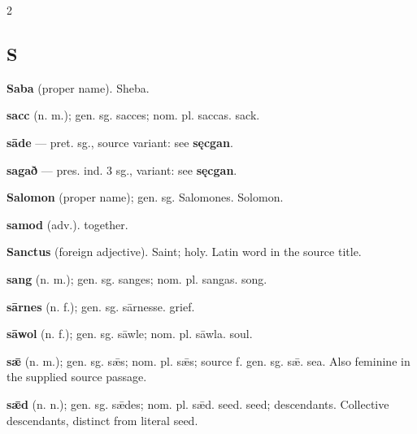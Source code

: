 \begin{multicols*}{2}
\subsection*{S}
\textbf{Saba} (proper name). Sheba.\par
\textbf{sacc} (n. m.); gen. sg. sacces; nom. pl. saccas. sack.\par
\textbf{sāde} — pret. sg., source variant: see \textbf{sęcgan}.\par
\textbf{sagað} — pres. ind. 3 sg., variant: see \textbf{sęcgan}.\par
\textbf{Salomon} (proper name); gen. sg. Salomones. Solomon.\par
\textbf{samod} (adv.). together.\par
\textbf{Sanctus} (foreign adjective). Saint; holy. Latin word in the source title.\par
\textbf{sang} (n. m.); gen. sg. sanges; nom. pl. sangas. song.\par
\textbf{sārnes} (n. f.); gen. sg. sārnesse. grief.\par
\textbf{sāwol} (n. f.); gen. sg. sāwle; nom. pl. sāwla. soul.\par
\textbf{sǣ} (n. m.); gen. sg. sǣs; nom. pl. sǣs; source f. gen. sg. sǣ. sea. Also feminine in the supplied source passage.\par
\textbf{sǣd} (n. n.); gen. sg. sǣdes; nom. pl. sǣd. seed. seed; descendants. Collective descendants, distinct from literal seed.\par

\end{multicols*}
